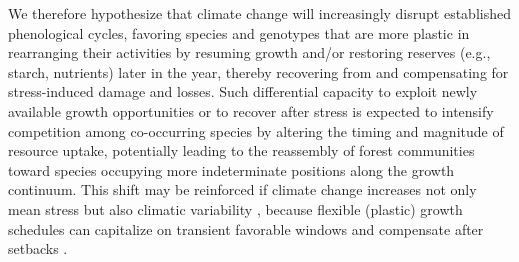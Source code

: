 \documentclass{article}
\begin{document}
We therefore hypothesize that climate change will increasingly disrupt established phenological cycles, favoring species and genotypes that are more plastic in rearranging their activities by resuming growth and/or restoring reserves (e.g., starch, nutrients) later in the year, thereby recovering from and compensating for stress-induced damage and losses. Such differential capacity to exploit newly available growth opportunities or to recover after stress is expected to intensify competition among co-occurring species by altering the timing and magnitude of resource uptake, potentially leading to the reassembly of forest communities toward species occupying more indeterminate positions along the growth continuum. This shift may be reinforced if climate change increases not only mean stress but also climatic variability \citep{vanderwielContributionClimaticChanges2021}, because flexible (plastic) growth schedules can capitalize on transient favorable windows and compensate after setbacks \citep{richterPhenotypicPlasticityFacilitates2012, chevinAdaptationPlasticityExtinction2010, boteroEvolutionaryTippingPoints2015}.\\
	

	
	
\end{document}
